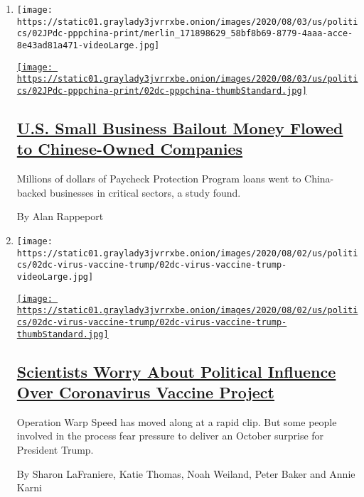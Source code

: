\begin{enumerate}
\def\labelenumi{\arabic{enumi}.}
\item
  \texttt{[image: https://static01.graylady3jvrrxbe.onion/images/2020/08/03/us/politics/02JPdc-pppchina-print/merlin\_171898629\_58bf8b69-8779-4aaa-acce-8e43ad81a471-videoLarge.jpg]}

  \href{/2020/08/02/us/politics/virus-china-ppp-small-business-loans.html}{\texttt{[image: https://static01.graylady3jvrrxbe.onion/images/2020/08/03/us/politics/02JPdc-pppchina-print/02dc-pppchina-thumbStandard.jpg]}}

  \hypertarget{us-small-business-bailout-money-flowed-to-chinese-owned-companies}{%
  \subsection{\texorpdfstring{\href{/2020/08/02/us/politics/virus-china-ppp-small-business-loans.html}{U.S.
  Small Business Bailout Money Flowed to Chinese-Owned
  Companies}}{U.S. Small Business Bailout Money Flowed to Chinese-Owned Companies}}\label{us-small-business-bailout-money-flowed-to-chinese-owned-companies}}

  Millions of dollars of Paycheck Protection Program loans went to
  China-backed businesses in critical sectors, a study found.

  By Alan Rappeport
\item
  \texttt{[image: https://static01.graylady3jvrrxbe.onion/images/2020/08/02/us/politics/02dc-virus-vaccine-trump/02dc-virus-vaccine-trump-videoLarge.jpg]}

  \href{/2020/08/02/us/politics/coronavirus-vaccine.html}{\texttt{[image: https://static01.graylady3jvrrxbe.onion/images/2020/08/02/us/politics/02dc-virus-vaccine-trump/02dc-virus-vaccine-trump-thumbStandard.jpg]}}

  \hypertarget{scientists-worry-about-political-influence-over-coronavirus-vaccine-project}{%
  \subsection{\texorpdfstring{\href{/2020/08/02/us/politics/coronavirus-vaccine.html}{Scientists
  Worry About Political Influence Over Coronavirus Vaccine
  Project}}{Scientists Worry About Political Influence Over Coronavirus Vaccine Project}}\label{scientists-worry-about-political-influence-over-coronavirus-vaccine-project}}

  Operation Warp Speed has moved along at a rapid clip. But some people
  involved in the process fear pressure to deliver an October surprise
  for President Trump.

  By Sharon LaFraniere, Katie Thomas, Noah Weiland, Peter Baker and
  Annie Karni
\end{enumerate}

